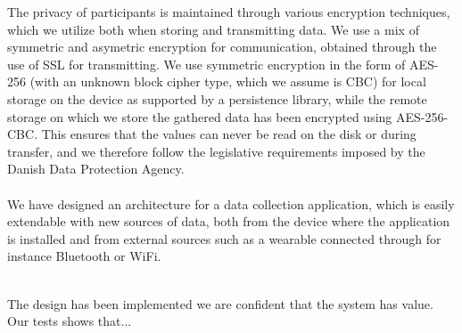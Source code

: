 The privacy of participants is maintained through various encryption techniques, which we utilize both when storing and transmitting data. We use a mix of symmetric and asymetric encryption for communication, obtained through the use of SSL for transmitting. We use symmetric encryption in the form of AES-256 (with an unknown block cipher type, which we assume is CBC) for local storage on the device as supported by a persistence library, while the remote storage on which we store the gathered data has been encrypted using AES-256-CBC. This ensures that the values can never be read on the disk or during transfer, and we therefore follow the legislative requirements imposed by the Danish Data Protection Agency. 
\\\\
We have designed an architecture for a data collection application, which is easily extendable with new sources of data, both from the device where the application is installed and from external sources such as a wearable connected through for instance Bluetooth or WiFi.
\\\\



The design has been implemented we are confident that the system has value. Our tests shows that... 



